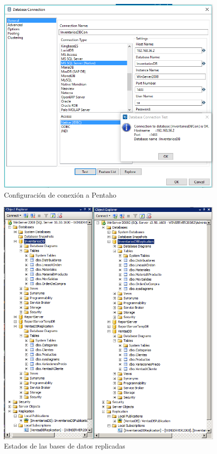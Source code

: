 \documentclass{article}
\begin{document}
\begin{figure}[!ht]
  \caption{Configuraci\'on de conexi\'on a Pentaho}
  \centering
    \includegraphics[width=1\textwidth]{pentahoDBCon1.PNG}
\end{figure}

\begin{figure}[!ht]
  \caption{Estados de las bases de datos replicadas}
  \centering
    \includegraphics[width=1\textwidth]{replicacionFull.PNG}
\end{figure}
\end{document}
